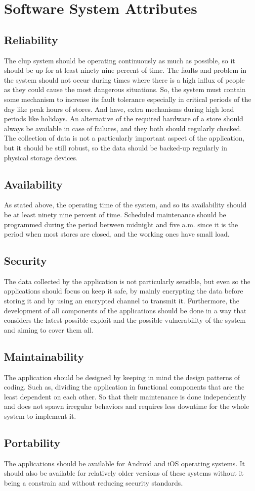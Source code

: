 \section{Software System Attributes}

\subsection{Reliability}
The \gls{clup} system should be operating continuously as much as possible, so it should be up for at least ninety nine percent of time. The faults and problem in the system should not occur during times where there is a high influx of people as they could cause the most dangerous situations. So, the system must contain some mechanism to increase its fault tolerance especially in critical periods of the day like peak hours of stores. And have, extra mechanisms during high load periods like holidays. An alternative of the required hardware of a store should always be available in case of failures, and they both should regularly checked.
 The collection of data is not a particularly important aspect of the application, but it should be still robust, so the data should be backed-up regularly in physical storage devices. 

\subsection{Availability}
As stated above, the operating time of the system, and so its availability should be at least ninety nine percent of time. Scheduled maintenance should be programmed during the period between midnight and five a.m. since it is the period when most stores are closed, and the working ones have small load.

\subsection{Security}
The data collected by the application is not particularly sensible, but even so the applications should focus on keep it safe, by mainly encrypting the data before storing it and by using an encrypted channel to transmit it. Furthermore, the development of all components of the applications should be done in a way that considers the latest possible exploit and the possible vulnerability of the system and aiming to cover them all.  

\subsection{Maintainability}
The application should be designed by keeping in mind the design patterns of coding. Such as, dividing the application in functional components that are the least dependent on each other. So that their maintenance is done independently and does not spawn irregular behaviors and requires less downtime for the whole system to implement it. 

\subsection{Portability}
The applications should be available for Android and iOS operating systems. It should also be available for relatively older versions of these systems without it being a constrain and without reducing security standards.
